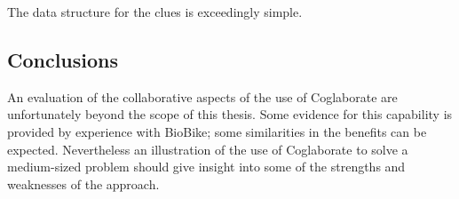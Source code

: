 The data structure for the clues is exceedingly simple. 




\subsection{Conclusions}




An evaluation of the collaborative aspects of the use of Coglaborate
are unfortunately beyond the scope of this thesis.  Some evidence for
this capability is provided by experience with BioBike; some
similarities in the benefits can be expected.  Nevertheless an
illustration of the use of Coglaborate to solve a medium-sized problem
should give insight into some of the strengths and weaknesses of the
approach.
